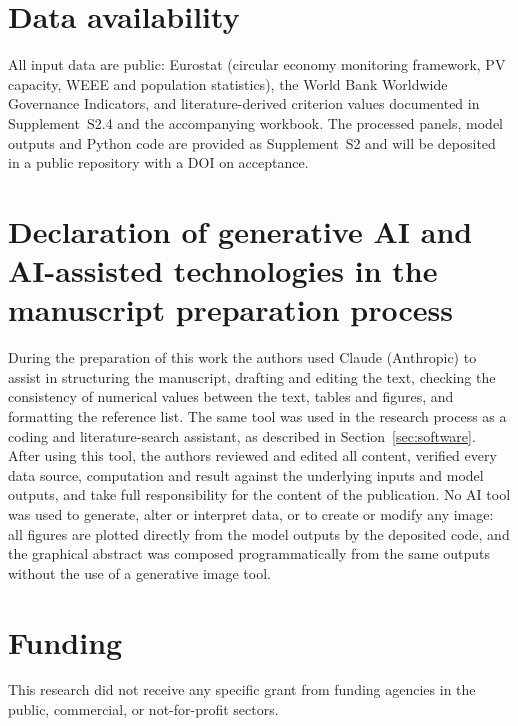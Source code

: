\documentclass[a4paper,fleqn]{cas-sc}
\begin{document}
\section*{Data availability}
All input data are public: Eurostat (circular economy monitoring framework, PV capacity, WEEE and population statistics), the World Bank Worldwide Governance Indicators, and literature-derived criterion values documented in Supplement~S2.4 and the accompanying workbook. The processed panels, model outputs and Python code are provided as Supplement~S2 and will be deposited in a public repository with a DOI on acceptance.

\section*{Declaration of generative AI and AI-assisted technologies in the manuscript preparation process}
During the preparation of this work the authors used Claude (Anthropic) to assist in structuring the manuscript, drafting and editing the text, checking the consistency of numerical values between the text, tables and figures, and formatting the reference list. The same tool was used in the research process as a coding and literature-search assistant, as described in Section~\ref{sec:software}. After using this tool, the authors reviewed and edited all content, verified every data source, computation and result against the underlying inputs and model outputs, and take full responsibility for the content of the publication. No AI tool was used to generate, alter or interpret data, or to create or modify any image: all figures are plotted directly from the model outputs by the deposited code, and the graphical abstract was composed programmatically from the same outputs without the use of a generative image tool.

\section*{Funding}
This research did not receive any specific grant from funding agencies in the public, commercial, or not-for-profit sectors.



\end{document}
